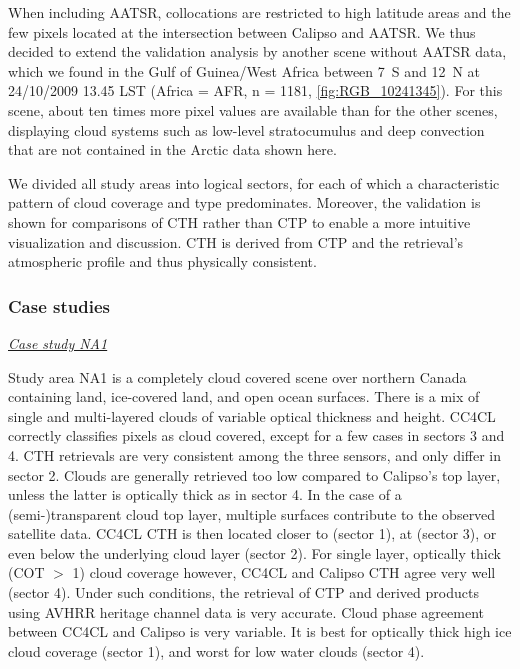 When including AATSR, collocations are restricted to high latitude areas and the few pixels located at the intersection between Calipso and AATSR. We thus decided to extend the validation analysis by another scene without AATSR data, which we found in the Gulf of Guinea/West Africa between 7\textdegree\ S and 12\textdegree\ N at 24/10/2009 13.45 LST (Africa = AFR, n = 1181, \cref{fig:RGB_10241345}). For this scene, about ten times more pixel values are available than for the other scenes, displaying cloud systems such as low-level stratocumulus and deep convection that are not contained in the Arctic data shown here. 

We divided all study areas into logical sectors, for each of which a characteristic pattern of cloud coverage and type predominates. Moreover, the validation is shown for comparisons of CTH rather than CTP to enable a more intuitive visualization and discussion. CTH is derived from CTP and the retrieval's atmospheric profile and thus physically consistent. 

\subsubsection{Case studies}

\vspace{5mm}\underline{\textit{Case study NA1}}\vspace{2mm}

Study area NA1 is a completely cloud covered scene over northern Canada containing land, ice-covered land, and open ocean surfaces. There is a mix of single and multi-layered clouds of variable optical thickness and height. 
CC4CL correctly classifies pixels as cloud covered, except for a few cases in sectors 3 and 4. CTH retrievals are very consistent among the three sensors, and only differ in sector 2. Clouds are generally retrieved too low compared to Calipso's top layer, unless the latter is optically thick as in sector 4. In the case of a (semi-)transparent cloud top layer, multiple surfaces contribute to the observed satellite data. CC4CL CTH is then located closer to (sector 1), at (sector 3), or even below the underlying cloud layer (sector 2). For single layer, optically thick (COT $>$ 1) cloud coverage however, CC4CL and Calipso CTH agree very well (sector 4). Under such conditions, the retrieval of CTP and derived products using AVHRR heritage channel data is very accurate. Cloud phase agreement between CC4CL and Calipso is very variable. It is best for optically thick high ice cloud coverage (sector 1), and worst for low water clouds (sector 4).

